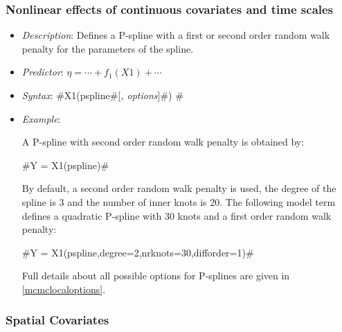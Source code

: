 

\subsubsection*{Nonlinear effects of continuous covariates and time scales}


\begin{itemize}
\item[] {\em Description}: Defines a P-spline with a first or
second order random walk penalty for the parameters of the spline.

\item[] {\em Predictor}: $\eta =  \cdots + f_1(X1) + \cdots$

\item[] {\em Syntax}:
#X1(pspline#[{\em , options}]#) #

\item[] {\em Example}:

A P-spline with second order random walk penalty is obtained by:

#Y = X1(pspline)#

By default, a second order random walk penalty is used, the degree of the spline is 3 and the number of inner
knots is 20. The following model term defines a quadratic P-spline
with 30 knots and a first order random walk penalty:

#Y = X1(pspline,degree=2,nrknots=30,difforder=1)#

Full details about all possible options for P-splines are given in
\autoref{mcmclocaloptions}.
\end{itemize}



\subsubsection*{Spatial Covariates}

